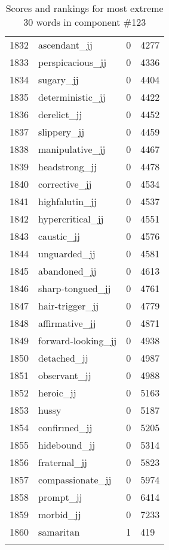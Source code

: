 \begin{longtable}[!htbp]{| rlr@{.}l |}
    1832 & ascendant\_jj & 0 & 4277 \\
    1833 & perspicacious\_jj & 0 & 4336 \\
    1834 & sugary\_jj & 0 & 4404 \\
    1835 & deterministic\_jj & 0 & 4422 \\
    1836 & derelict\_jj & 0 & 4452 \\
    1837 & slippery\_jj & 0 & 4459 \\
    1838 & manipulative\_jj & 0 & 4467 \\
    1839 & headstrong\_jj & 0 & 4478 \\
    1840 & corrective\_jj & 0 & 4534 \\
    1841 & highfalutin\_jj & 0 & 4537 \\
    1842 & hypercritical\_jj & 0 & 4551 \\
    1843 & caustic\_jj & 0 & 4576 \\
    1844 & unguarded\_jj & 0 & 4581 \\
    1845 & abandoned\_jj & 0 & 4613 \\
    1846 & sharp-tongued\_jj & 0 & 4761 \\
    1847 & hair-trigger\_jj & 0 & 4779 \\
    1848 & affirmative\_jj & 0 & 4871 \\
    1849 & forward-looking\_jj & 0 & 4938 \\
    1850 & detached\_jj & 0 & 4987 \\
    1851 & observant\_jj & 0 & 4988 \\
    1852 & heroic\_jj & 0 & 5163 \\
    1853 & hussy & 0 & 5187 \\
    1854 & confirmed\_jj & 0 & 5205 \\
    1855 & hidebound\_jj & 0 & 5314 \\
    1856 & fraternal\_jj & 0 & 5823 \\
    1857 & compassionate\_jj & 0 & 5974 \\
    1858 & prompt\_jj & 0 & 6414 \\
    1859 & morbid\_jj & 0 & 7233 \\
    1860 & samaritan & 1 & 419 \\
    \hline
    \caption{Scores and rankings for most extreme 30 words in component \#123} \\
\end{longtable}
